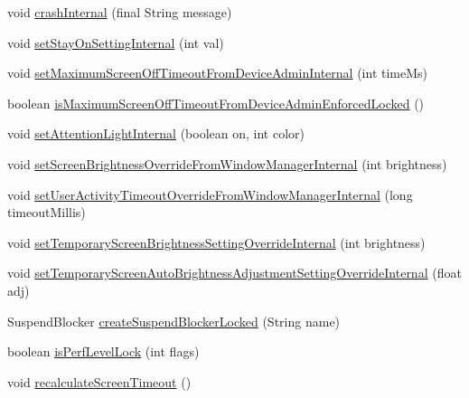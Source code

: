 \begin{DoxyCompactItemize}
void \hyperlink{classcom_1_1android_1_1server_1_1power_1_1PowerManagerService_ad1a8d7c25597561b2adc8d41913d31c8}{crash\-Internal} (final String message)
\item 
void \hyperlink{classcom_1_1android_1_1server_1_1power_1_1PowerManagerService_a476a15a656079eea14ccdf0ac254efc3}{set\-Stay\-On\-Setting\-Internal} (int val)
\item 
void \hyperlink{classcom_1_1android_1_1server_1_1power_1_1PowerManagerService_a2c68b048df33d0f0d126669d9c77a7fa}{set\-Maximum\-Screen\-Off\-Timeout\-From\-Device\-Admin\-Internal} (int time\-Ms)
\item 
boolean \hyperlink{classcom_1_1android_1_1server_1_1power_1_1PowerManagerService_acf364d5ddca279d7b91325ef2eace263}{is\-Maximum\-Screen\-Off\-Timeout\-From\-Device\-Admin\-Enforced\-Locked} ()
\item 
void \hyperlink{classcom_1_1android_1_1server_1_1power_1_1PowerManagerService_a3187cf7a45a8ce318f86c6f1fdedf291}{set\-Attention\-Light\-Internal} (boolean on, int color)
\item 
void \hyperlink{classcom_1_1android_1_1server_1_1power_1_1PowerManagerService_a522b37fc3ab3890454d7f7d0c3419f97}{set\-Screen\-Brightness\-Override\-From\-Window\-Manager\-Internal} (int brightness)
\item 
void \hyperlink{classcom_1_1android_1_1server_1_1power_1_1PowerManagerService_a59dc79c24455a865c24038ccc4ef6d40}{set\-User\-Activity\-Timeout\-Override\-From\-Window\-Manager\-Internal} (long timeout\-Millis)
\item 
void \hyperlink{classcom_1_1android_1_1server_1_1power_1_1PowerManagerService_a54c53ec1feec474c1e4585881462d4fa}{set\-Temporary\-Screen\-Brightness\-Setting\-Override\-Internal} (int brightness)
\item 
void \hyperlink{classcom_1_1android_1_1server_1_1power_1_1PowerManagerService_a217610f7ba2584d72eb458e72cb78d1a}{set\-Temporary\-Screen\-Auto\-Brightness\-Adjustment\-Setting\-Override\-Internal} (float adj)
\item 
Suspend\-Blocker \hyperlink{classcom_1_1android_1_1server_1_1power_1_1PowerManagerService_ab3b092c1dc0fafc3a799aa63190236c4}{create\-Suspend\-Blocker\-Locked} (String name)
\item 
boolean \hyperlink{classcom_1_1android_1_1server_1_1power_1_1PowerManagerService_a7a9940524f04fc4cb73b0e68ae1f0b02}{is\-Perf\-Level\-Lock} (int flags)
\item 
void \hyperlink{classcom_1_1android_1_1server_1_1power_1_1PowerManagerService_ad4e7d0a1cbe7772d3bc03c5fb07bd14e}{recalculate\-Screen\-Timeout} ()

\end{DoxyCompactItemize}
